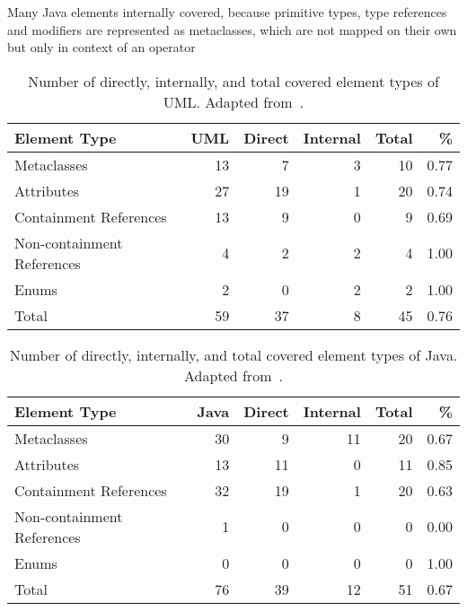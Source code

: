 Many Java elements internally covered, because primitive types, type references and modifiers are represented as metaclasses, which are not mapped on their own but only in context of an operator

\begin{table}[htb]
	\centering
		\begin{tabular}{lrrrrr}
			\toprule
			\multicolumn{1}{l}{\bfseries Element Type} & \multicolumn{1}{r}{\bfseries UML} & \multicolumn{1}{r}{\bfseries Direct} & \multicolumn{1}{r}{\bfseries Internal} & \multicolumn{1}{r}{\bfseries Total} & \multicolumn{1}{r}{\bfseries \%}\\
			\midrule
			Metaclasses 				& 13	& 7		& 3	& 10	& 0.77	\\
			Attributes 					& 27	& 19	& 1	& 20	& 0.74	\\
			Containment References 		& 13	& 9		& 0	& 9		& 0.69	\\
			Non-containment References 	& 4		& 2		& 2	& 4		& 1.00	\\
			Enums 						& 2		& 0		& 2	& 2		& 1.00	\\
			\midrule
			Total 						& 59	& 37	& 8	& 45	& 0.76	\\
			\bottomrule
		\end{tabular}
	\caption{Number of directly, internally, and total covered element types of UML. Adapted from~\cite[Table 10.4]{hennig2020ma}.}
	\label{tab:commonalities_evaluation:coverage_uml}
\end{table}


\begin{table}[htb]
	\centering
		\begin{tabular}{lrrrrr}
			\toprule
			\multicolumn{1}{l}{\bfseries Element Type} & \multicolumn{1}{r}{\bfseries Java} & \multicolumn{1}{r}{\bfseries Direct} & \multicolumn{1}{r}{\bfseries Internal} & \multicolumn{1}{r}{\bfseries Total} & \multicolumn{1}{r}{\bfseries \%}\\
			\midrule
			Metaclasses 				& 30	& 9		& 11	& 20	& 0.67	\\
			Attributes 					& 13	& 11	& 0		& 11	& 0.85	\\
			Containment References 		& 32	& 19	& 1		& 20	& 0.63	\\
			Non-containment References 	& 1		& 0		& 0		& 0		& 0.00	\\
			Enums 						& 0		& 0		& 0		& 0		& 1.00	\\
			\midrule
			Total 						& 76	& 39	& 12	& 51	& 0.67	\\
			\bottomrule
		\end{tabular}
	\caption{Number of directly, internally, and total covered element types of Java. Adapted from~\cite[Table 10.5]{hennig2020ma}.}
	\label{tab:commonalities_evaluation:coverage_java}
\end{table}


